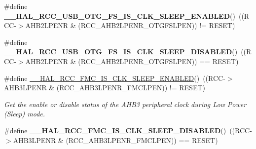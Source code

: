 \begin{DoxyCompactItemize}
\item 
\mbox{\label{group___r_c_c___clock___sleep___enable___disable___status_gae909235d04d1d7f80c39ce1f1f7c1ca9}} 
\#define {\bfseries \+\_\+\+\_\+\+H\+A\+L\+\_\+\+R\+C\+C\+\_\+\+U\+S\+B\+\_\+\+O\+T\+G\+\_\+\+F\+S\+\_\+\+I\+S\+\_\+\+C\+L\+K\+\_\+\+S\+L\+E\+E\+P\+\_\+\+E\+N\+A\+B\+L\+ED}()~((R\+CC-\/$>$A\+H\+B2\+L\+P\+E\+NR \& (R\+C\+C\+\_\+\+A\+H\+B2\+L\+P\+E\+N\+R\+\_\+\+O\+T\+G\+F\+S\+L\+P\+EN)) != R\+E\+S\+ET)
\item 
\mbox{\label{group___r_c_c___clock___sleep___enable___disable___status_ga024f17028026c6c954378beeb1deca10}} 
\#define {\bfseries \+\_\+\+\_\+\+H\+A\+L\+\_\+\+R\+C\+C\+\_\+\+U\+S\+B\+\_\+\+O\+T\+G\+\_\+\+F\+S\+\_\+\+I\+S\+\_\+\+C\+L\+K\+\_\+\+S\+L\+E\+E\+P\+\_\+\+D\+I\+S\+A\+B\+L\+ED}()~((R\+CC-\/$>$A\+H\+B2\+L\+P\+E\+NR \& (R\+C\+C\+\_\+\+A\+H\+B2\+L\+P\+E\+N\+R\+\_\+\+O\+T\+G\+F\+S\+L\+P\+EN)) == R\+E\+S\+ET)
\item 
\#define \mbox{\hyperlink{group___r_c_c___clock___sleep___enable___disable___status_ga48c04810c9a18c1a80f14361b3c421c6}{\+\_\+\+\_\+\+H\+A\+L\+\_\+\+R\+C\+C\+\_\+\+F\+M\+C\+\_\+\+I\+S\+\_\+\+C\+L\+K\+\_\+\+S\+L\+E\+E\+P\+\_\+\+E\+N\+A\+B\+L\+ED}}()~((R\+CC-\/$>$A\+H\+B3\+L\+P\+E\+NR \& (R\+C\+C\+\_\+\+A\+H\+B3\+L\+P\+E\+N\+R\+\_\+\+F\+M\+C\+L\+P\+EN)) != R\+E\+S\+ET)
\begin{DoxyCompactList}\small\item\em Get the enable or disable status of the A\+H\+B3 peripheral clock during Low Power (Sleep) mode. \end{DoxyCompactList}\item 
\mbox{\label{group___r_c_c___clock___sleep___enable___disable___status_gab0219202590eeb28176221cfdfdb0a36}} 
\#define {\bfseries \+\_\+\+\_\+\+H\+A\+L\+\_\+\+R\+C\+C\+\_\+\+F\+M\+C\+\_\+\+I\+S\+\_\+\+C\+L\+K\+\_\+\+S\+L\+E\+E\+P\+\_\+\+D\+I\+S\+A\+B\+L\+ED}()~((R\+CC-\/$>$A\+H\+B3\+L\+P\+E\+NR \& (R\+C\+C\+\_\+\+A\+H\+B3\+L\+P\+E\+N\+R\+\_\+\+F\+M\+C\+L\+P\+EN)) == R\+E\+S\+ET)
\item 
\mbox{\label{group___r_c_c___clock___sleep___enable___disable___status_ga6045813cfc84282f250adc5fbc24e394}} 

\end{DoxyCompactItemize}
